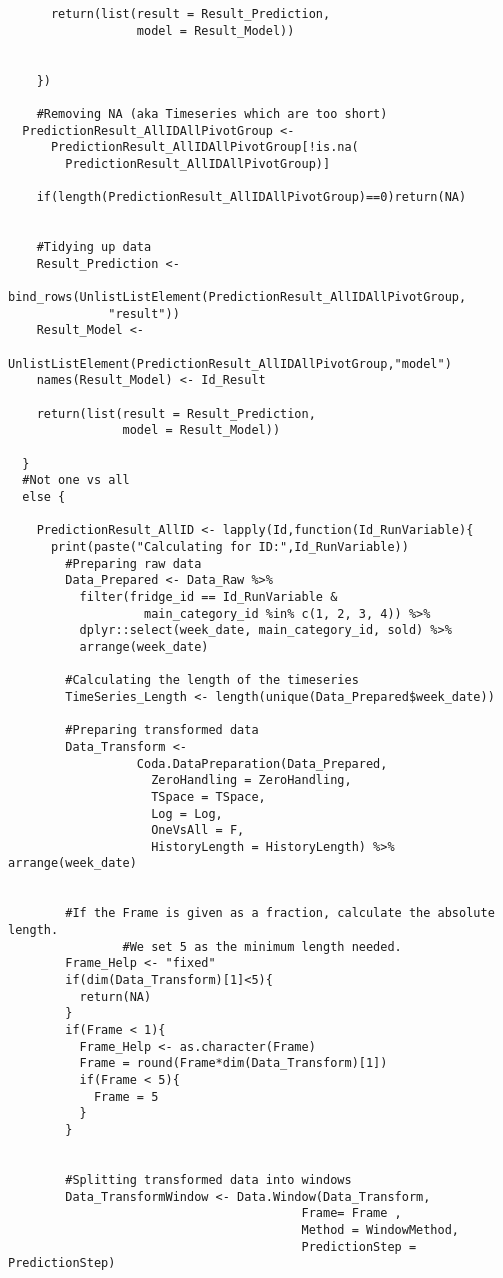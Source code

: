 \begin{verbatim}
      return(list(result = Result_Prediction,
                  model = Result_Model))
    
      
    })
  
    #Removing NA (aka Timeseries which are too short)
  PredictionResult_AllIDAllPivotGroup <- 
	  PredictionResult_AllIDAllPivotGroup[!is.na(
		PredictionResult_AllIDAllPivotGroup)]
  
    if(length(PredictionResult_AllIDAllPivotGroup)==0)return(NA)
  
  
    #Tidying up data
    Result_Prediction <- 
		  bind_rows(UnlistListElement(PredictionResult_AllIDAllPivotGroup,
			  "result"))
    Result_Model <- 
		  UnlistListElement(PredictionResult_AllIDAllPivotGroup,"model")
    names(Result_Model) <- Id_Result
  
    return(list(result = Result_Prediction,
                model = Result_Model))
    
  }
  #Not one vs all
  else {
    
    PredictionResult_AllID <- lapply(Id,function(Id_RunVariable){
      print(paste("Calculating for ID:",Id_RunVariable))
        #Preparing raw data
        Data_Prepared <- Data_Raw %>%
          filter(fridge_id == Id_RunVariable &
                   main_category_id %in% c(1, 2, 3, 4)) %>%
          dplyr::select(week_date, main_category_id, sold) %>%
          arrange(week_date)
        
        #Calculating the length of the timeseries
        TimeSeries_Length <- length(unique(Data_Prepared$week_date))
        
        #Preparing transformed data
        Data_Transform <- 
				  Coda.DataPreparation(Data_Prepared, 
					ZeroHandling = ZeroHandling,
					TSpace = TSpace, 
					Log = Log,
					OneVsAll = F,
					HistoryLength = HistoryLength) %>% arrange(week_date)
        
        
        #If the Frame is given as a fraction, calculate the absolute length. 
				#We set 5 as the minimum length needed.
        Frame_Help <- "fixed"
        if(dim(Data_Transform)[1]<5){
          return(NA)
        }
        if(Frame < 1){
          Frame_Help <- as.character(Frame)
          Frame = round(Frame*dim(Data_Transform)[1])
          if(Frame < 5){
            Frame = 5
          }
        }
        
        
        #Splitting transformed data into windows
        Data_TransformWindow <- Data.Window(Data_Transform,
                                         Frame= Frame ,
                                         Method = WindowMethod,
                                         PredictionStep = PredictionStep)
        

\end{verbatim}
